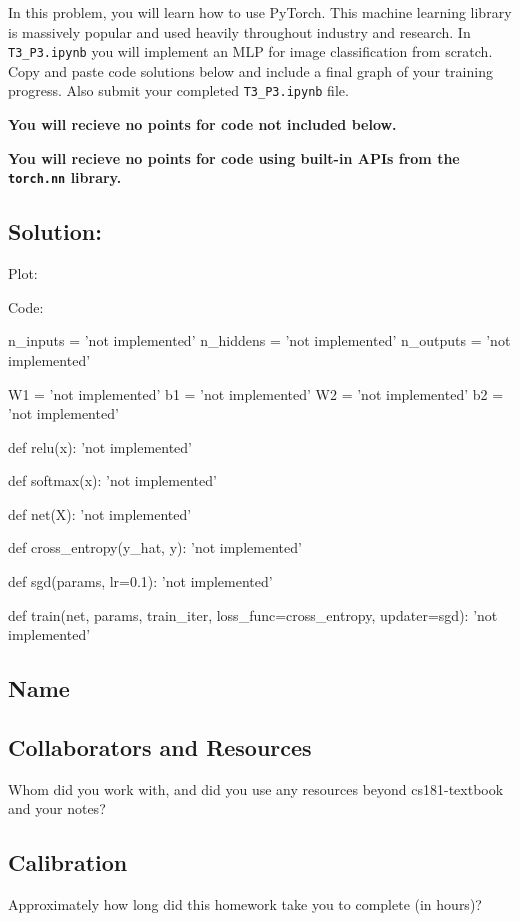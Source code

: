 \documentclass[submit]{harvardml}
\begin{document}
\newpage

\begin{problem}
  In this problem, you will learn how to use PyTorch. This machine learning library is massively popular and used heavily throughout industry and research. In \verb|T3_P3.ipynb| you will implement an MLP for image classification from scratch. Copy and paste code solutions below and include a final graph of your training progress. Also submit your completed \verb|T3_P3.ipynb| file.

  {\bfseries You will recieve no points for code not included below.}

  {\bfseries You will recieve no points for code using built-in APIs from the \verb|torch.nn| library.}
  
\end{problem}


\subsection*{Solution:}
Plot:


Code:

\begin{python}
n_inputs = 'not implemented'
n_hiddens = 'not implemented'
n_outputs = 'not implemented'

W1 = 'not implemented'
b1 = 'not implemented'
W2 = 'not implemented'
b2 = 'not implemented'



def relu(x):
    'not implemented'



def softmax(x):
    'not implemented'



def net(X):
  'not implemented'



def cross_entropy(y_hat, y):
  'not implemented'



def sgd(params, lr=0.1):
  'not implemented'



def train(net, params, train_iter, loss_func=cross_entropy, updater=sgd):
  'not implemented'

\end{python}


\newpage
\subsection*{Name}

\subsection*{Collaborators and Resources}
Whom did you work with, and did you use any resources beyond cs181-textbook and your notes?

\subsection*{Calibration}
Approximately how long did this homework take you to complete (in hours)? 
\end{document}
